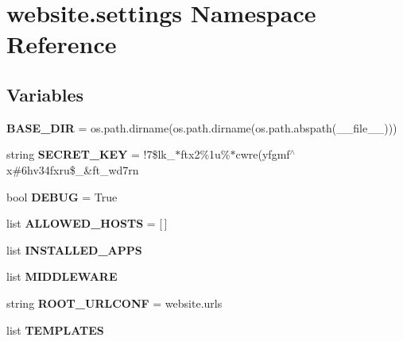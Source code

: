 \hypertarget{namespacewebsite_1_1settings}{}\section{website.\+settings Namespace Reference}
\label{namespacewebsite_1_1settings}
\subsection*{Variables}
\begin{DoxyCompactItemize}
\item 
\mbox{\label{namespacewebsite_1_1settings_aff43897f7ff64636b7021f906c30c708}} 
{\bfseries B\+A\+S\+E\+\_\+\+D\+IR} = os.\+path.\+dirname(os.\+path.\+dirname(os.\+path.\+abspath(\+\_\+\+\_\+file\+\_\+\+\_\+)))
\item 
\mbox{\label{namespacewebsite_1_1settings_a7f314970e1f31ea728f18461d6846353}} 
string {\bfseries S\+E\+C\+R\+E\+T\+\_\+\+K\+EY} = \textquotesingle{}!7\$lk\+\_$\ast$ftx2\%1u\%$\ast$cwre(yfgmf$^\wedge$x\#6hv34fxru\$\+\_\+\&ft\+\_\+wd7rn\textquotesingle{}
\item 
\mbox{\label{namespacewebsite_1_1settings_a860294c45fef6192f1f3467ed2a75903}} 
bool {\bfseries D\+E\+B\+UG} = True
\item 
\mbox{\label{namespacewebsite_1_1settings_afd6dc045d364a1c07aa8cf62e576b77f}} 
list {\bfseries A\+L\+L\+O\+W\+E\+D\+\_\+\+H\+O\+S\+TS} = \mbox{[}$\,$\mbox{]}
\item 
list {\bfseries I\+N\+S\+T\+A\+L\+L\+E\+D\+\_\+\+A\+P\+PS}
\item 
list {\bfseries M\+I\+D\+D\+L\+E\+W\+A\+RE}
\item 
\mbox{\label{namespacewebsite_1_1settings_a98691318a80487c955bb01af7c2a7976}} 
string {\bfseries R\+O\+O\+T\+\_\+\+U\+R\+L\+C\+O\+NF} = \textquotesingle{}website.\+urls\textquotesingle{}
\item 
list {\bfseries T\+E\+M\+P\+L\+A\+T\+ES}
\item 
\mbox{\label{namespacewebsite_1_1settings_afeac806b69aeb474b55b732bafdf1731}} 

\end{DoxyCompactItemize}
